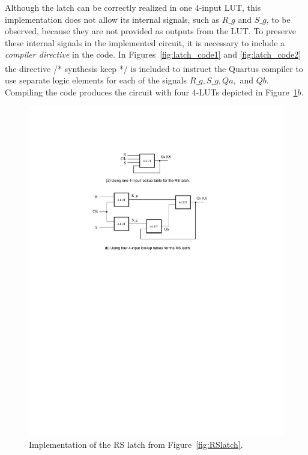 \documentclass[epsfig,10pt,fullpage]{article}
\begin{document}
Although the latch can be correctly realized in one 4-input LUT, this implementation
does not allow its internal signals, such as $R\_g$ and $S\_g$, to be observed, because
they are not provided as outputs from the LUT. To preserve these internal signals in 
the implemented circuit, it is necessary to include a {\it compiler
directive} in the code. In Figures~\ref{fig:latch_code1}
and \ref{fig:latch_code2} the directive /* synthesis keep */ is
included to instruct the Quartus\textsuperscript{\textregistered} compiler to use separate logic elements for each of
the signals $R\_g, S\_g, Qa,$ and $Qb$. Compiling the code produces the circuit with four
4-LUTs depicted in Figure~\ref{fig:RSlatch_cct}$b$. 

\begin{figure}[H]
	\begin{center}
		\includegraphics[]{figures/figure3.pdf}
	\end{center}
	\caption{Implementation of the RS latch from Figure~\ref{fig:RSlatch}.}
\label{fig:RSlatch_cct}
\end{figure}
\end{document}

